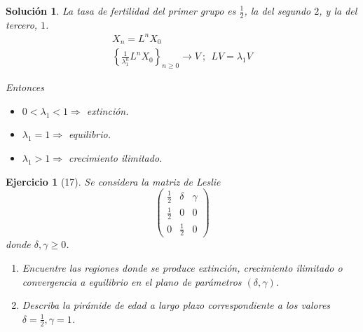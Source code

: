 \documentclass[11pt, a4paper]{article}
\newif\IfInSansMode
\numberwithin{equation}{section}
\theoremstyle{theorem-style}
\theoremstyle{definition-style}
\newtheorem{ejer}{Ejercicio}[section]
\theoremstyle{remark-style}
\newtheorem*{sol}{Solución}
\theoremstyle{example-style}
\begin{document}
\begin{sol}
    La tasa de fertilidad del primer grupo es $\frac{1}{2}$, la del segundo $2$, y la del tercero, $1$.
    \begin{align*}
        \label{}
        X_n = L^nX_0 \\
        \left\{ \frac{1}{\lambda_1^n} L^nX_0 \right\}_{n \geq 0} \rightarrow V \ ; \ \ LV = \lambda_1V
        \end{align*}

        Entonces \begin{itemize}
            \item $0 < \lambda_1 < 1 \Rightarrow$ extinción.
            \item $\lambda_1 = 1 \Rightarrow$ equilibrio.
            \item $\lambda_1 > 1 \Rightarrow$ crecimiento ilimitado.
        \end{itemize}
\end{sol}

\begin{ejer}[17]
    Se considera la matriz de Leslie $$\begin{pmatrix}
        \frac{1}{2} & \delta & \gamma \\
        \frac{1}{2} & 0 & 0 \\
        0 & \frac{1}{2} & 0
    \end{pmatrix}$$ donde $\delta, \gamma \geq 0$. \begin{enumerate}[label=\alph*)]
        \item Encuentre las regiones donde se produce extinción, crecimiento ilimitado o convergencia a equilibrio en el plano de parámetros $(\delta, \gamma)$.
        \item Describa la pirámide de edad a largo plazo correspondiente a los valores $\delta = \frac{1}{2}, \gamma = 1$.
        
    \end{enumerate}
\end{ejer}
\end{document}
